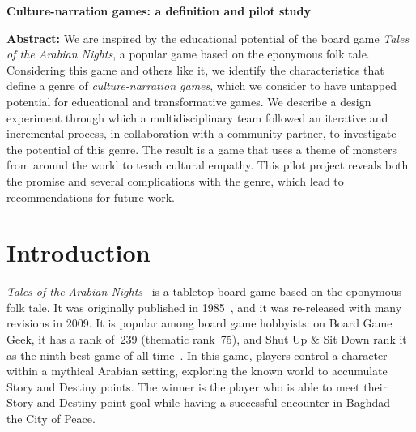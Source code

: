 \documentclass[a4paper]{article}
\newcommand{\projecttitle}{Culture-narration games: a definition and pilot study}
\begin{document}
\begin{center}
\fontsize{14}{16.8}\selectfont
\bf \projecttitle
\end{center}

\vspace{-0.25in}
\begin{center}
\iftoggle{blind}{
}{
Paul Gestwicki, Kaley Rittichier, and Austin DeArmond, Ball State University\\
pvgestwicki@bsu.edu, kjrittichier@bsu.edu, ajdearmond@bsu.edu\\
}
\end{center}

\newcommand{\totan}{\textit{TotAN}}
\newcommand{\smersh}{\textit{SMERSH}}
\newcommand{\figwidth}{2.5in}

%
\begin{adjustwidth}{0.5in}{0.5in}
  \textbf{Abstract:} We are inspired by the educational potential of
  the board game \textit{Tales of the Arabian Nights}, a
  popular game based on the eponymous folk tale. Considering this game
  and others like it, we identify the characteristics that define a
  genre of \textit{culture-narration games}, which we consider to have
  untapped potential for educational and transformative games.
  We describe a design experiment through which a multidisciplinary team
  followed an iterative and incremental process, in collaboration
  with a community partner, to investigate the potential of this genre.
  The result is a game that uses a theme of monsters from around the
  world to teach cultural empathy.
  This pilot project reveals both the promise and several complications
  with the genre, which lead to recommendations for future work.
\end{adjustwidth}

\section{Introduction}


\textit{Tales of the Arabian Nights}~\citep{Goldberg2009} is a 
tabletop board game based on the eponymous folk tale. It was
originally published in 1985~\citep{Goldberg1985}, and it was
re-released with many revisions in 2009.
It is popular among board game hobbyists:
on Board Game Geek, it has a rank of~239 (thematic rank~75),
and Shut Up \& Sit Down rank it as the ninth best game of all 
time~\citep{ShutUp2015}.
In this game, players control a character within a mythical Arabian
setting, exploring the known world to accumulate Story and
Destiny points. The winner is the player who is able to meet their 
Story and Destiny point goal while having a successful encounter
in Baghdad---the City of Peace. 
\end{document}
